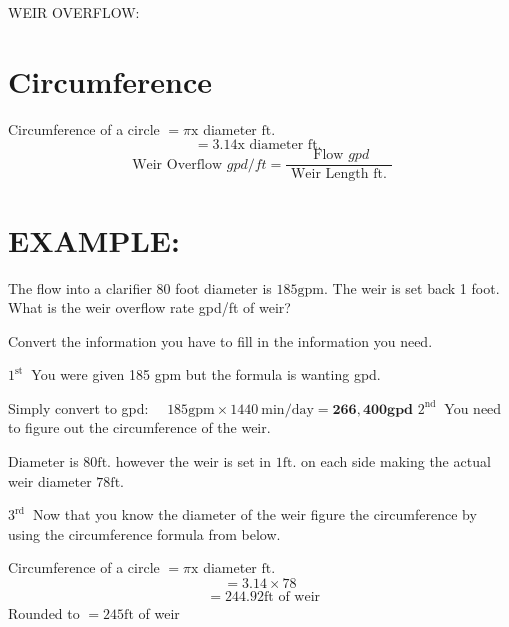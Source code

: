 \documentclass[10pt]{article}
\begin{document}
WEIR OVERFLOW:

\section{Circumference}
Circumference of a circle $=\pi \mathrm{x}$ diameter $\mathrm{ft}$.
$$
=3.14 \mathrm{x} \text { diameter } \mathrm{ft} \text {. }
$$
$$
\text { Weir Overflow } g p d / f t=\frac{\text { Flow } g p d}{\text { Weir Length ft. }}
$$

\section{EXAMPLE:}
The flow into a clarifier 80 foot diameter is $185 \mathrm{gpm}$. The weir is set back 1 foot. What is the weir overflow rate gpd/ft of weir?

Convert the information you have to fill in the information you need.

$1^{\text {st }}$ You were given 185 gpm but the formula is wanting gpd.

Simply convert to gpd: $\quad 185 \mathrm{gpm} \times 1440 \mathrm{~min} / \mathrm{day}=\mathbf{2 6 6 , 4 0 0} \mathbf{g p d}$ $2^{\text {nd }}$ You need to figure out the circumference of the weir.

Diameter is $80 \mathrm{ft}$. however the weir is set in $1 \mathrm{ft}$. on each side making the actual weir diameter $78 \mathrm{ft}$.

$3^{\text {rd }}$ Now that you know the diameter of the weir figure the circumference by using the circumference formula from below.

Circumference of a circle $=\pi \mathrm{x}$ diameter $\mathrm{ft}$.
$$
=3.14 \times 78
$$
$$
\begin{aligned}
& =244.92 \mathrm{ft} \text { of weir }
\end{aligned}
$$
Rounded to $=245 \mathrm{ft}$ of weir
\end{document}
